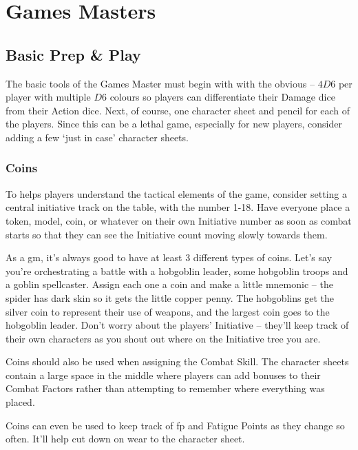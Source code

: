 \chapter{Games Masters}

\section{Basic Prep \& Play}

\begin{multicols}{2}

The basic tools of the Games Master must begin with with the obvious -- $4D6$ per player with multiple $D6$ colours so players can differentiate their Damage dice from their Action dice.
Next, of course, one character sheet and pencil for each of the players.
Since this can be a lethal game, especially for new players, consider adding a few `just in case' character sheets.

\subsection{Coins}

To helps players understand the tactical elements of the game, consider setting a central initiative track on the table, with the number 1-18.
Have everyone place a token, model, coin, or whatever on their own Initiative number as soon as combat starts so that they can see the Initiative count moving slowly towards them.

As a \gls{gm}, it's always good to have at least 3 different types of coins.
Let's say you're orchestrating a battle with a hobgoblin leader, some hobgoblin troops and a goblin spellcaster.
Assign each one a coin and make a little mnemonic -- the spider has dark skin so it gets the little copper penny.
The hobgoblins get the silver coin to represent their use of weapons, and the largest coin goes to the hobgoblin leader.
Don't worry about the players' Initiative -- they'll keep track of their own characters as you shout out where on the Initiative tree you are.

Coins should also be used when assigning the Combat Skill.
The character sheets contain a large space in the middle where players can add bonuses to their Combat Factors rather than attempting to remember where everything was placed.

Coins can even be used to keep track of \gls{fp} and Fatigue Points as they change so often.
It'll help cut down on wear to the character sheet.

\end{multicols}

